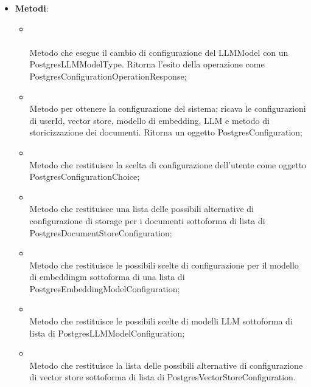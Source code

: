 \documentclass[10pt, a4paper]{article}
\begin{document}
    \label{PostgresConfigurationORMDettaglio}
    \begin{itemize}
        \item \textbf{Metodi}:
        \begin{itemize}
            \item {}\\ \\
            Metodo che esegue il cambio di configurazione del LLMModel con un PostgresLLMModelType. Ritorna l'esito della operazione come PostgresConfigurationOperationResponse;

            \item {}\\
            Metodo per ottenere la configurazione del sistema; ricava le configurazioni di userId, vector store, modello di embedding, LLM e metodo di storicizzazione dei documenti. Ritorna un oggetto PostgresConfiguration;
            \item {}\\
            Metodo che restituisce la scelta di configurazione dell'utente come oggetto PostgresConfigurationChoice;

            \item {}\\
            Metodo che restituisce una lista delle possibili alternative di configurazione di storage per i documenti sottoforma di lista di PostgresDocumentStoreConfiguration;

            \item {}\\
            Metodo che restituisce le possibili scelte di configurazione per il modello di embeddingm sottoforma di una lista di PostgresEmbeddingModelConfiguration;

            \item {}\\
            Metodo che restituisce le possibili scelte di modelli LLM sottoforma di  lista di PostgresLLMModelConfiguration;

            \item {}\\
            Metodo che restituisce la lista delle possibili alternative di configurazione di vector store sottoforma di lista di PostgresVectorStoreConfiguration.
            
        \end{itemize}
    \end{itemize}
\end{document}
